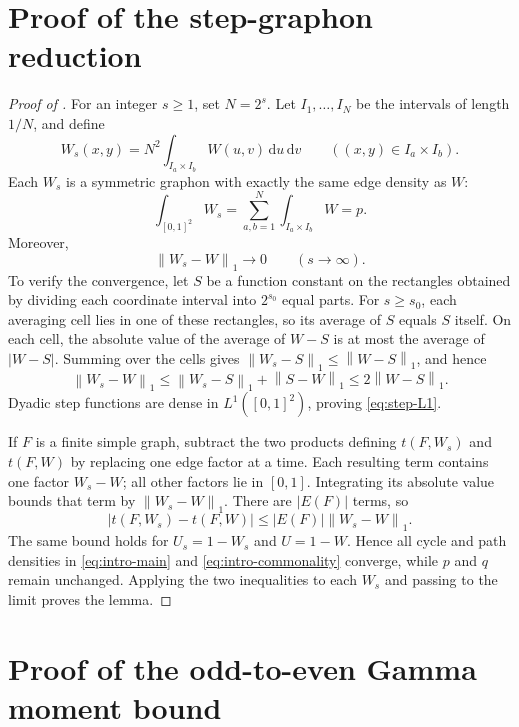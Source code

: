 \documentclass[11pt]{article}
\theoremstyle{remark}
\numberwithin{equation}{section}
\newcommand{\norm}[1]{\left\lVert #1\right\rVert}
\newcommand{\dd}{\,\mathrm d}
\newcommand{\dens}[2]{t(#1,#2)}
\begin{document}
\appendix
{}

\section{Proof of the step-graphon reduction}
\label{app:step-reduction}

\begin{proof}[Proof of ]
  For an integer $s\ge1$, set $N=2^s$. Let $I_1,\ldots,I_N$ be the
  intervals of length $1/N$, and
  define
  \[
    W_s(x,y)=N^2\int_{I_a\times I_b}W(u,v)\dd u\dd v
    \qquad ((x,y)\in I_a\times I_b).
  \]
  Each $W_s$ is a symmetric graphon with exactly the same edge density as
  $W$:
  \[
    \int_{[0,1]^2}W_s
    =\sum_{a,b=1}^N\int_{I_a\times I_b}W=p.
  \]
  Moreover,
  \begin{equation}\label{eq:step-L1}
    \norm{W_s-W}_1\longrightarrow0
    \qquad(s\to\infty).
  \end{equation}
  To verify the convergence, let $S$ be a function constant on the
  rectangles obtained by dividing each coordinate interval into
  $2^{s_0}$ equal parts. For $s\ge s_0$, each averaging cell lies in
  one of these rectangles, so its average of $S$ equals $S$ itself.
  On each cell, the absolute value of the average of $W-S$ is at most
  the average of $|W-S|$. Summing over the cells gives
  $\norm{W_s-S}_1\le\norm{W-S}_1$, and hence
  \[
    \norm{W_s-W}_1
    \le \norm{W_s-S}_1+\norm{S-W}_1
    \le2\norm{W-S}_1.
  \]
  Dyadic step functions are dense in $L^1([0,1]^2)$, proving
  \eqref{eq:step-L1}.

  If $F$ is a finite simple graph, subtract the two products defining
  $\dens F{W_s}$ and $\dens FW$ by replacing one edge factor at a time.
  Each resulting term contains one factor $W_s-W$; all other factors
  lie in $[0,1]$. Integrating its absolute value bounds that term by
  $\norm{W_s-W}_1$. There are $|E(F)|$ terms, so
  \[
    \left|\dens F{W_s}-\dens FW\right|
    \le |E(F)|\norm{W_s-W}_1.
  \]
  The same bound holds for $U_s=1-W_s$ and $U=1-W$. Hence all cycle and
  path densities in \eqref{eq:intro-main} and
  \eqref{eq:intro-commonality} converge, while $p$ and $q$
  remain unchanged.
  Applying the two inequalities to each $W_s$ and passing to the limit
  proves the lemma.
\end{proof}

\section{Proof of the odd-to-even Gamma moment bound}
\label{app:gamma-moment}
\end{document}
